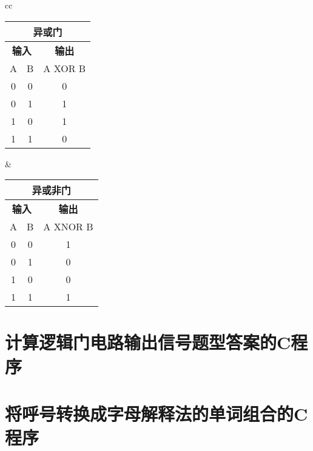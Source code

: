 \begin{tabular}{cc}%
    \begin{tabular}{|c|c|c|}
        \multicolumn{3}{c}{\textbf{异或门}} \\
        \hline
        \multicolumn{2}{|c|}{\textbf{输入}} & \textbf{输出} \\
        \hline
        A & B & A XOR B \\
        \hline
        \num{0} & \num{0} & \num{0} \\
        \hline
        \num{0} & \num{1} & \num{1} \\
        \hline
        \num{1} & \num{0} & \num{1} \\
        \hline
        \num{1} & \num{1} & \num{0} \\
        \hline
    \end{tabular} &
    \begin{tabular}{|c|c|c|}
        \multicolumn{3}{c}{\textbf{异或非门}} \\
        \hline
        \multicolumn{2}{|c|}{\textbf{输入}} & \textbf{输出} \\
        \hline
        A & B & A XNOR B \\
        \hline
        \num{0} & \num{0} & \num{1} \\
        \hline
        \num{0} & \num{1} & \num{0} \\
        \hline
        \num{1} & \num{0} & \num{0} \\
        \hline
        \num{1} & \num{1} & \num{1} \\
        \hline
    \end{tabular} \tabularnewline
\end{tabular}

\newpage

\section{计算逻辑门电路输出信号题型答案的C程序}



\newpage



\section{将呼号转换成字母解释法的单词组合的C程序}



\newpage



